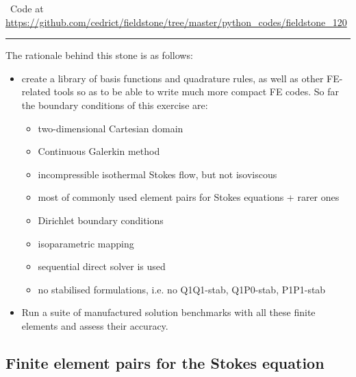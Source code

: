 %

\begin{center}
\inpython~Code at \url{https://github.com/cedrict/fieldstone/tree/master/python_codes/fieldstone_120}
\end{center}

\par\noindent\rule{\textwidth}{0.4pt}


The rationale behind this stone is as follows:
\begin{itemize}
\item create a library of basis functions and quadrature rules, as well as 
other FE-related tools so as to be able to write much more compact FE codes. 
So far the boundary conditions of this exercise are:
\begin{itemize}
\item two-dimensional Cartesian domain
\item Continuous Galerkin method
\item incompressible isothermal Stokes flow, but not isoviscous
\item most of commonly used element pairs for Stokes equations + rarer ones 
\item Dirichlet boundary conditions 
\item isoparametric mapping
\item sequential direct solver is used
\item no stabilised formulations, i.e. no Q1Q1-stab, Q1P0-stab, P1P1-stab
\end{itemize}
\item Run a suite of manufactured solution benchmarks with all 
these finite elements and assess their accuracy.
\end{itemize}


\subsection*{Finite element pairs for the Stokes equation}

